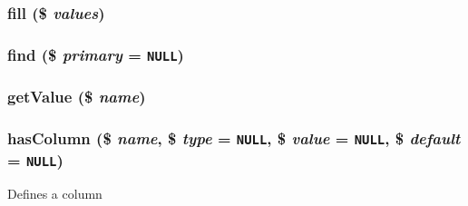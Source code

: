 \hypertarget{class_cahnory_d_b___record_e8ed0112c0675ef955f6b14917b3e13d}{
\subsubsection[{fill}]{\setlength{\rightskip}{0pt plus 5cm}fill (\$ {\em values})}}
\label{class_cahnory_d_b___record_e8ed0112c0675ef955f6b14917b3e13d}


\hypertarget{class_cahnory_d_b___record_3e9c1a619dd1ff40931b92383c37b403}{
\subsubsection[{find}]{\setlength{\rightskip}{0pt plus 5cm}find (\$ {\em primary} = {\tt NULL})}}
\label{class_cahnory_d_b___record_3e9c1a619dd1ff40931b92383c37b403}


\hypertarget{class_cahnory_d_b___record_8c584efa272687554bd9abe5e83fe10c}{
\subsubsection[{getValue}]{\setlength{\rightskip}{0pt plus 5cm}getValue (\$ {\em name})}}
\label{class_cahnory_d_b___record_8c584efa272687554bd9abe5e83fe10c}


\hypertarget{class_cahnory_d_b___record_01fd43fd23f987cc60b16b738500f761}{
\subsubsection[{hasColumn}]{\setlength{\rightskip}{0pt plus 5cm}hasColumn (\$ {\em name}, \/  \$ {\em type} = {\tt NULL}, \/  \$ {\em value} = {\tt NULL}, \/  \$ {\em default} = {\tt NULL})}}
\label{class_cahnory_d_b___record_01fd43fd23f987cc60b16b738500f761}


Defines a column

